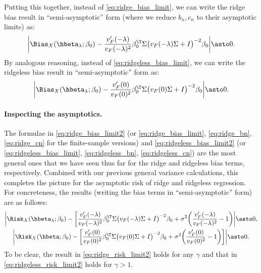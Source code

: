 \documentclass{article}
\begin{document}
Putting this together, instead of \eqref{eq:ridge_bias_limit}, we can write the 
ridge bias result in ``semi-asymptotic'' form (where we reduce $b_n,c_n$ to
their asymptotic limits) as:    
\begin{equation}
\label{eq:ridge_bias_limit2}
\bigg| \Bias_X(\hbeta_\lambda; \beta_0) - \frac{v'_F(-\lambda)}{v_F(-\lambda)^2}
\beta_0^\T \Sigma \big( v_F(-\lambda) \Sigma + I \big)^{-2} \beta_0 \bigg| \asto
0.
\end{equation}
By analogous reasoning, instead of \eqref{eq:ridgeless_bias_limit}, we can write
the ridgeless bias result in ``semi-asymptotic'' form as:
\begin{equation}
\label{eq:ridgeless_bias_limit2}
\bigg| \Bias_X(\hbeta_\lambda; \beta_0) - \frac{v'_F(0)}{v_F(0)^2} \beta_0^\T
\Sigma \big( v_F(0) \Sigma + I \big)^{-2} \beta_0 \bigg| \asto 0.
\end{equation}

\paragraph{Inspecting the asymptotics.}

The formulae in \eqref{eq:ridge_bias_limit2} (or \eqref{eq:ridge_bias_limit},
\eqref{eq:ridge_bn}, \eqref{eq:ridge_cn} for the finite-sample versions) and 
\eqref{eq:ridgeless_bias_limit2} (or \eqref{eq:ridgeless_bias_limit},
\eqref{eq:ridgeless_bn}, \eqref{eq:ridgeless_cn}) are the most general ones that
we have seen thus far for the ridge and ridgeless bias terms,
respectively. Combined with our previous general variance calculations, 
this completes the picture for the asymptotic risk of ridge and ridgeless
regression. For concreteness, the results (writing the bias terms in
``semi-asymptotic'' form) are as follows:
\begin{gather}
\label{eq:ridge_risk_limit2}
\bigg| \Risk_X(\hbeta_\lambda; \beta_0) - \bigg[
\frac{v'_F(-\lambda)}{v_F(-\lambda)^2} \beta_0^\T \Sigma \big( v_F(-\lambda)
\Sigma + I \big)^{-2} \beta_0 + \sigma^2 \bigg(
\frac{v'_F(-\lambda)}{v_F(-\lambda)^2} - 1 \bigg) \bigg|  \asto 0, \\     
\label{eq:ridgeless_risk_limit2}
\bigg| \Risk_X(\hbeta; \beta_0) - \bigg[ \frac{v'_F(0)}{v_F(0)^2} \beta_0^\T
\Sigma \big( v_F(0) \Sigma + I \big)^{-2} \beta_0 + \sigma^2 \bigg(
\frac{v'_F(0)}{v_F(0)^2} - 1 \bigg) \bigg] \bigg| \asto 0.
\end{gather}
To be clear, the result in \eqref{eq:ridge_risk_limit2} holds for any $\gamma$
and that in \eqref{eq:ridgeless_risk_limit2} holds for $\gamma>1$.
\end{document}
